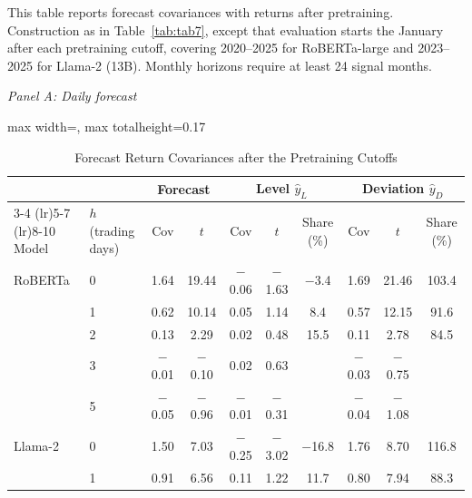 \begin{table}[htbp]
\centering
\caption{Forecast Return Covariances after the Pretraining Cutoffs}
\label{tab:tabC_post_horizons}
\begin{minipage}{\linewidth}\footnotesize
This table reports forecast covariances with returns after pretraining. Construction as in Table~\ref{tab:tab7}, except that evaluation starts the January after each pretraining cutoff, covering 2020--2025 for RoBERTa-large and 2023--2025 for Llama-2 (13B). Monthly horizons require at least 24 signal months.
\end{minipage}
\medskip

{\footnotesize
\textit{Panel A: Daily forecast}\\[2pt]
\begin{adjustbox}{max width=\linewidth, max totalheight=0.17\textheight}
\begin{tabular}{llcccccccc}
\toprule
\multicolumn{2}{c}{} & \multicolumn{2}{c}{Forecast} & \multicolumn{3}{c}{Level $\hat y_L$} & \multicolumn{3}{c}{Deviation $\hat y_D$} \\
\cmidrule(lr){3-4} \cmidrule(lr){5-7} \cmidrule(lr){8-10}
Model & $h$ (trading days) & Cov & $t$ & Cov & $t$ & Share (\%) & Cov & $t$ & Share (\%) \\
\midrule
RoBERTa & 0 & \phantom{$-$}1.64 & \phantom{$-$}19.44 & $-$0.06 & $-$1.63 & \phantom{0}$-$3.4 & \phantom{$-$}1.69 & \phantom{$-$}21.46 & 103.4 \\
 & 1 & \phantom{$-$}0.62 & \phantom{$-$}10.14 & \phantom{$-$}0.05 & \phantom{$-$}1.14 & \phantom{$-$0}8.4 & \phantom{$-$}0.57 & \phantom{$-$}12.15 & \phantom{0}91.6 \\
 & 2 & \phantom{$-$}0.13 & \phantom{$-$0}2.29 & \phantom{$-$}0.02 & \phantom{$-$}0.48 & \phantom{$-$}15.5 & \phantom{$-$}0.11 & \phantom{$-$0}2.78 & \phantom{0}84.5 \\
 & 3 & $-$0.01 & \phantom{0}$-$0.10 & \phantom{$-$}0.02 & \phantom{$-$}0.63 &  & $-$0.03 & \phantom{0}$-$0.75 &  \\
 & 5 & $-$0.05 & \phantom{0}$-$0.96 & $-$0.01 & $-$0.31 &  & $-$0.04 & \phantom{0}$-$1.08 &  \\
\midrule
Llama-2 & 0 & \phantom{$-$}1.50 & \phantom{$-$0}7.03 & $-$0.25 & $-$3.02 & $-$16.8 & \phantom{$-$}1.76 & \phantom{$-$0}8.70 & 116.8 \\
 & 1 & \phantom{$-$}0.91 & \phantom{$-$0}6.56 & \phantom{$-$}0.11 & \phantom{$-$}1.22 & \phantom{$-$}11.7 & \phantom{$-$}0.80 & \phantom{$-$0}7.94 & \phantom{0}88.3 \\

\end{tabular}
\end{adjustbox}}
\end{table}
